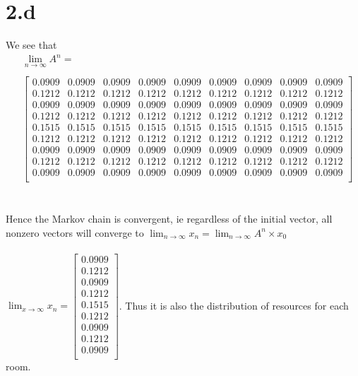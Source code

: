 \documentclass[letterpaper,12pt,titlepage,oneside,final]{book}
\begin{document}
\section*{2.d}
We see that 
\begin{align*}
&\lim_{n \to \infty} A^n = \\
\\
&\begin{bmatrix}
0.0909 & 0.0909 & 0.0909 & 0.0909 & 0.0909 & 0.0909 & 0.0909 & 0.0909 & 0.0909\\
0.1212 & 0.1212 & 0.1212 & 0.1212 & 0.1212 & 0.1212 & 0.1212 & 0.1212 & 0.1212\\
0.0909 & 0.0909 & 0.0909 & 0.0909 & 0.0909 & 0.0909 & 0.0909 & 0.0909 & 0.0909\\
0.1212 & 0.1212 & 0.1212 & 0.1212 & 0.1212 & 0.1212 & 0.1212 & 0.1212 & 0.1212\\
0.1515 & 0.1515 & 0.1515 & 0.1515 & 0.1515 & 0.1515 & 0.1515 & 0.1515 & 0.1515\\
0.1212 & 0.1212 & 0.1212 & 0.1212 & 0.1212 & 0.1212 & 0.1212 & 0.1212 & 0.1212\\
0.0909 & 0.0909 & 0.0909 & 0.0909 & 0.0909 & 0.0909 & 0.0909 & 0.0909 & 0.0909\\
0.1212 & 0.1212 & 0.1212 & 0.1212 & 0.1212 & 0.1212 & 0.1212 & 0.1212 & 0.1212\\
0.0909 & 0.0909 & 0.0909 & 0.0909 & 0.0909 & 0.0909 & 0.0909 & 0.0909 & 0.0909\\
\end{bmatrix}
\end{align*}
\\
\\
Hence the Markov chain is convergent, ie regardless of the initial vector, all nonzero vectors will converge to $\lim_{n \to \infty} x_{n} = \lim_{n \to \infty} A^n \times x_0 $\\
\\
$\lim_{x \to \infty} x_{n} = 
\begin{bmatrix}    
    0.0909\\
    0.1212\\
    0.0909\\
    0.1212\\
    0.1515\\
    0.1212\\
    0.0909\\
    0.1212\\
    0.0909\\
\end{bmatrix}$. Thus it is also the distribution of resources for each room.
\end{document}
